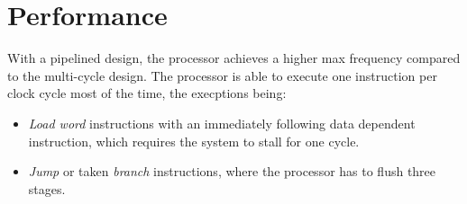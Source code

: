 \section{Performance}
With a pipelined design, the processor achieves a higher max frequency compared to the multi-cycle design.
The processor is able to execute one instruction per clock cycle most of the time,
the execptions being:

\begin{itemize}
    \item \textit{Load word} instructions with an immediately following data dependent instruction,
        which requires the system to stall for one cycle.
    \item \textit{Jump} or taken \textit{branch} instructions,
        where the processor has to flush three stages.
\end{itemize}


